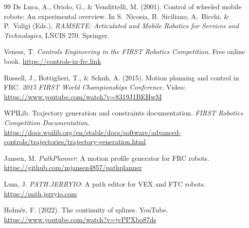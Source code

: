 \documentclass[11pt]{article}
\begin{document}
\begin{thebibliography}{99}
De Luca, A., Oriolo, G., \& Vendittelli, M. (2001). Control of wheeled mobile robots: An experimental overview. In S.~Nicosia, B.~Siciliano, A.~Bicchi, \& P.~Valigi (Eds.), \emph{RAMSETE: Articulated and Mobile Robotics for Services and Technologies}, LNCIS 270. Springer.

Veness, T. \emph{Controls Engineering in the FIRST Robotics Competition}. Free online book. \url{https://controls-in-frc.link}

Russell, J., Bottiglieri, T., \& Schuh, A. (2015). Motion planning and control in FRC. \emph{2015 FIRST World Championships Conference}. Video: \url{https://www.youtube.com/watch?v=8319J1BEHwM}

WPILib. Trajectory generation and constraints documentation. \emph{FIRST Robotics Competition Documentation}. \url{https://docs.wpilib.org/en/stable/docs/software/advanced-controls/trajectories/trajectory-generation.html}

Jansen, M. \emph{PathPlanner}: A motion profile generator for FRC robots. \url{https://github.com/mjansen4857/pathplanner}

Lum, J. \emph{PATH.JERRYIO}: A path editor for VEX and FTC robots. \url{https://path.jerryio.com}

Holm\'er, F. (2022). The continuity of splines. YouTube. \url{https://www.youtube.com/watch?v=jvPPXbo87ds}
\end{thebibliography}
\end{document}
